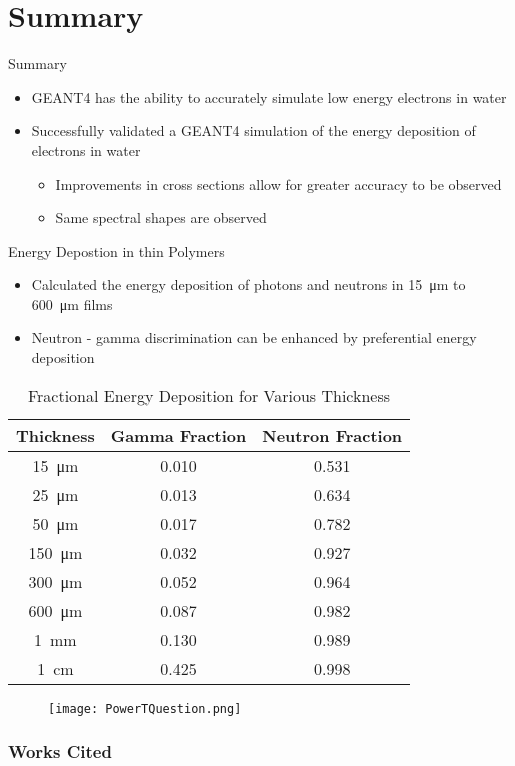 \documentclass[compress]{beamer}
\begin{document}
\section{Summary}
\begin{frame}{Summary}
  \begin{itemize}
    \item GEANT4 has the ability to accurately simulate low energy electrons in water
    \item Successfully validated a GEANT4 simulation of the energy deposition of electrons in water
    \begin{itemize}
      \item Improvements in cross sections allow for greater accuracy to be observed
      \item Same spectral shapes are observed
    \end{itemize}
  \end{itemize}
\end{frame}
\begin{frame}{Energy Depostion in thin Polymers}
  \begin{itemize}
    \item Calculated the energy deposition of  photons and neutrons in \SI{15}{\um} to \SI{600}{\um} films
    \item Neutron - gamma discrimination can be enhanced by preferential energy deposition
  \end{itemize}
  \begin{table}[ht]
      \caption{Fractional Energy Deposition for Various Thickness}
    \centering
    \begin{tabular}{c | c c}
    Thickness & Gamma Fraction & Neutron Fraction \\
    \hline
    \hline
    \SI{15}{\um} & 0.010 & 0.531 \\
    \SI{25}{\um} & 0.013 & 0.634 \\
    \SI{50}{\um} & 0.017 & 0.782 \\
    \SI{150}{\um} & 0.032 & 0.927 \\
    \SI{300}{\um} & 0.052 & 0.964 \\
    \SI{600}{\um} & 0.087 & 0.982 \\
    \SI{1}{\mm} & 0.130 & 0.989 \\
    \SI{1}{\cm} & 0.425 & 0.998 \\
    \end{tabular}
    \label{tab:FractionEDep}
  \end{table}
\end{frame}
\begin{frame}{}
  \centering
  \begin{figure}
    \texttt{[image: PowerTQuestion.png]}
  \end{figure}
\end{frame}
\begin{frame}
\frametitle{Works Cited}
	\tiny
  
\end{frame}
\end{document}
